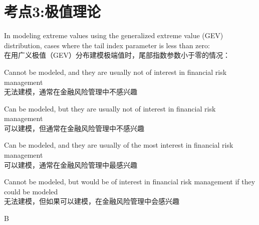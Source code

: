 \documentclass{article}
\newcounter{question} %
\begin{document}
\newpage



\section{考点3:极值理论}
\setcounter{question}{0}
\begin{question}
    In modeling extreme values using the generalized extreme value (GEV) distribution, cases where the tail index parameter is less than zero:
    \\在用广义极值（GEV）分布建模极端值时，尾部指数参数小于零的情况：
\end{question}

\begin{choices}
    \item Cannot be modeled, and they are usually not of interest in financial risk management\\
        无法建模，通常在金融风险管理中不感兴趣
    \item Can be modeled, but they are usually not of interest in financial risk management\\
        可以建模，但通常在金融风险管理中不感兴趣
    \item Can be modeled, and they are usually of the most interest in financial risk management\\
        可以建模，通常在金融风险管理中最感兴趣
    \item Cannot be modeled, but would be of interest in financial risk management if they could be modeled\\
        无法建模，但如果可以建模，在金融风险管理中会感兴趣
\end{choices}

\begin{correctanswer}
    B
\end{correctanswer}
\end{document}
